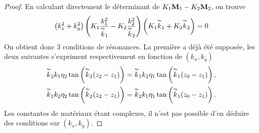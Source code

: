 \begin{proof}
    En calculant directement le déterminant de \(K_1\mathbf{M}_1-K_2\mathbf{M}_2\), on trouve
    \[
    \left(k_x^2+k_y^2\right)
    \left(K_1\dfrac{k_1^2}{\overset{\thicksim}{k}_1} - K_2\dfrac{k_2^2}{\overset{\thicksim}{k}_2}\right)
    \left(K_1\overset{\thicksim}{k}_1+K_2\overset{\thicksim}{k}_2\right) = 0
    \]
    On obtient donc 3 conditions de résonances.
    La première a déjà été supposée, les deux suivantes s'expriment respectivement en fonction de \((k_x,k_y)\)
    \begin{align*}
    \overset{\thicksim}{k}_2k_1\eta_2\tan\left(\overset{\thicksim}{k}_2(z_2-z_1)\right) &= \overset{\thicksim}{k}_1k_2\eta_1\tan\left(\overset{\thicksim}{k}_1(z_0-z_1)\right),
    \\
    \overset{\thicksim}{k}_1k_2\eta_2\tan\left(\overset{\thicksim}{k}_2(z_2-z_1)\right) &= \overset{\thicksim}{k}_2k_1\eta_1\tan\left(\overset{\thicksim}{k}_1(z_0-z_1)\right).
    \end{align*}
    Les constantes de matériaux étant complexes, il n'est pas possible d'en déduire des conditions sur \((k_x,k_y)\).
    \end{proof}
